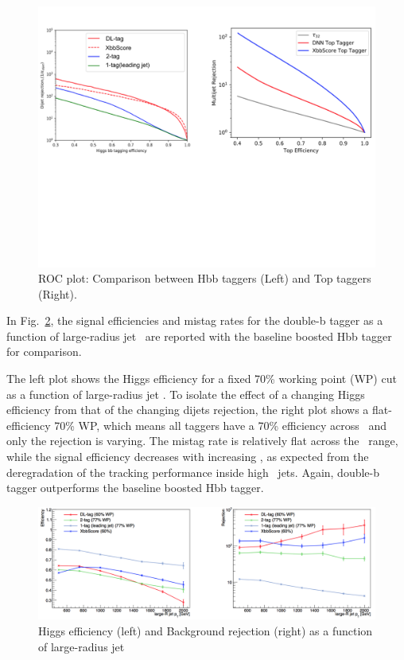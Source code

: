 \begin{figure}[htbp!]
    \centering
    \includegraphics[clip, trim=0 9cm 0 0, width=1\textwidth]{chapters/c10/figures/roc}
    \caption{ROC plot: Comparison between Hbb taggers (Left) and Top taggers (Right).}
    \label{fig:xbb_roc}
\end{figure}

\par In Fig.~\ref{fig:xbb_pt}, the signal efficiencies and mistag rates for the double-b tagger as a function of large-radius jet \pt~are reported with the baseline boosted Hbb tagger for comparison.

\par The left plot shows the Higgs efficiency for a fixed 70\% working point (WP) cut as a function of large-radius jet \pt. To isolate the effect of a changing Higgs efficiency from that of the changing dijets rejection, the right plot shows a flat-efficiency 70\% WP, which means all taggers have a 70\% efficiency across \pt~and only the rejection is varying. The mistag rate is relatively flat across the \pt~range, while the signal efficiency decreases with increasing \pt, as expected from the deregradation of the tracking performance inside high \pt~jets. 
Again, double-b tagger outperforms the baseline boosted Hbb tagger.

\begin{figure}[htbp!]
    \centering
    \includegraphics[clip, trim=0 0 0 0, width=1\textwidth]{chapters/c10/figures/pt}
    \caption{Higgs efficiency (left) and Background rejection (right) as a function of large-radius jet \pt}
    \label{fig:xbb_pt}
\end{figure}

